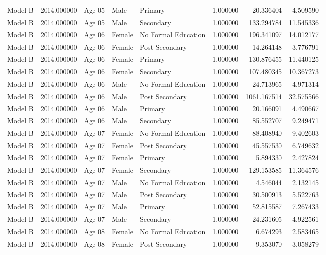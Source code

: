 \begin{table}[ht]
\begin{tabular}{lrlllrrr}
Model B & 2014.000000 & Age 05 & Male & Primary & 1.000000 & 20.336404 & 4.509590 \\
Model B & 2014.000000 & Age 05 & Male & Secondary & 1.000000 & 133.294784 & 11.545336 \\
Model B & 2014.000000 & Age 06 & Female & No Formal Education & 1.000000 & 196.341097 & 14.012177 \\
Model B & 2014.000000 & Age 06 & Female & Post Secondary & 1.000000 & 14.264148 & 3.776791 \\
Model B & 2014.000000 & Age 06 & Female & Primary & 1.000000 & 130.876455 & 11.440125 \\
Model B & 2014.000000 & Age 06 & Female & Secondary & 1.000000 & 107.480345 & 10.367273 \\
Model B & 2014.000000 & Age 06 & Male & No Formal Education & 1.000000 & 24.713965 & 4.971314 \\
Model B & 2014.000000 & Age 06 & Male & Post Secondary & 1.000000 & 1061.167514 & 32.575566 \\
Model B & 2014.000000 & Age 06 & Male & Primary & 1.000000 & 20.166091 & 4.490667 \\
Model B & 2014.000000 & Age 06 & Male & Secondary & 1.000000 & 85.552707 & 9.249471 \\
Model B & 2014.000000 & Age 07 & Female & No Formal Education & 1.000000 & 88.408940 & 9.402603 \\
Model B & 2014.000000 & Age 07 & Female & Post Secondary & 1.000000 & 45.557530 & 6.749632 \\
Model B & 2014.000000 & Age 07 & Female & Primary & 1.000000 & 5.894330 & 2.427824 \\
Model B & 2014.000000 & Age 07 & Female & Secondary & 1.000000 & 129.153585 & 11.364576 \\
Model B & 2014.000000 & Age 07 & Male & No Formal Education & 1.000000 & 4.546044 & 2.132145 \\
Model B & 2014.000000 & Age 07 & Male & Post Secondary & 1.000000 & 30.500913 & 5.522763 \\
Model B & 2014.000000 & Age 07 & Male & Primary & 1.000000 & 52.815587 & 7.267433 \\
Model B & 2014.000000 & Age 07 & Male & Secondary & 1.000000 & 24.231605 & 4.922561 \\
Model B & 2014.000000 & Age 08 & Female & No Formal Education & 1.000000 & 6.674293 & 2.583465 \\
Model B & 2014.000000 & Age 08 & Female & Post Secondary & 1.000000 & 9.353070 & 3.058279 \\

\end{tabular}
\end{table}
